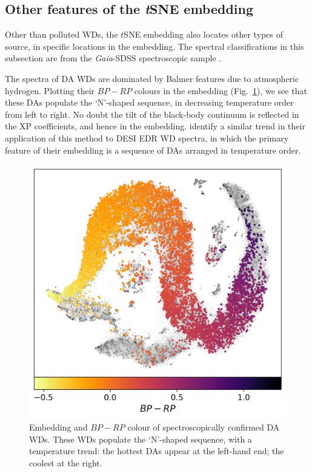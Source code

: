 \documentclass[fleqn,usenatbib]{rasti}
\begin{document}
\subsection{Other features of the \textit{t}SNE embedding}

Other than polluted WDs, the $t$SNE embedding also locates other types of source, in specific locations in the embedding.
The spectral classifications in this subsection are from the \textit{Gaia}-SDSS spectroscopic sample \citep{gentilefusillo21}.

The spectra of DA WDs are dominated by Balmer features due to atmospheric hydrogen.
Plotting their $\mathit{BP}-\mathit{RP}$ colours in the embedding (Fig.~\ref{fig:DAs}), we see that these DAs populate the `N'-shaped sequence, in decreasing temperature order from left to right.
No doubt the tilt of the black-body continuum is reflected in the XP coefficients, and hence in the embedding.
\citet{byrne24c} identify a similar trend in their application of this method to DESI EDR WD spectra, in which the primary feature of their embedding is a sequence of DAs arranged in temperature order.

\begin{figure}
\centering
\includegraphics[width=\columnwidth]{figures/fig4_DAsequence.png}
\caption{
    Embedding and $\mathit{BP}-\mathit{RP}$ colour of spectroscopically confirmed DA WDs.
    These WDs populate the `N'-shaped sequence, with a temperature trend: the hottest DAs appear at the left-hand end; the coolest at the right.
}
\label{fig:DAs}
\end{figure}
\end{document}
